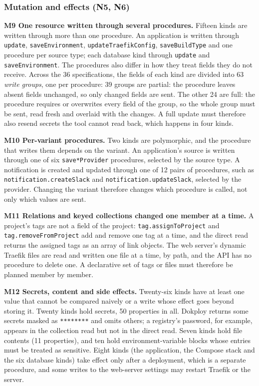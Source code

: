 \subsubsection*{Mutation and effects (N5, N6)}

\textbf{M9 One resource written through several procedures.} Fifteen kinds are written through more than one
procedure. An application is written through \texttt{update}, \texttt{saveEnvironment}, \texttt{updateTraefikConfig},
\texttt{saveBuildType} and one procedure per source type; each database kind through \texttt{update} and
\texttt{saveEnvironment}. The procedures also differ in how they treat fields they do not receive. Across
the 36 specifications, the fields of each kind are divided into 63 \emph{write groups}, one per procedure:
39 groups are partial: the procedure leaves absent fields unchanged, so only changed fields are sent.
The other 24 are full: the procedure requires or overwrites every field of the group, so the whole
group must be sent, read fresh and overlaid with the changes. A full update must therefore also resend
secrets the tool cannot read back, which happens in four kinds.

\textbf{M10 Per-variant procedures.} Two kinds are polymorphic, and the procedure that writes them depends
on the variant. An application's source is written through one of six \texttt{save*Provider} procedures,
selected by the source type. A notification is created and updated through one of 12 pairs of
procedures, such as \texttt{notification.createSlack} and \texttt{notification.updateSlack}, selected by the
provider. Changing the variant therefore changes which procedure is called, not only which values are
sent.

\textbf{M11 Relations and keyed collections changed one member at a time.} A project's tags are not a field
of the project: \texttt{tag.assignToProject} and \texttt{tag.removeFromProject} add and remove one tag at a time, and
the direct read returns the assigned tags as an array of link objects. The web server's dynamic
Traefik files are read and written one file at a time, by path, and the API has no procedure to delete
one. A declarative set of tags or files must therefore be planned member by member.

\textbf{M12 Secrets, content and side effects.} Twenty-six kinds have at least one value that cannot be
compared naively or a write whose effect goes beyond storing it. Twenty kinds hold secrets, 50
properties in all. Dokploy returns some secrets masked as \texttt{********} and omits others; a registry's
password, for example, appears in the collection read but not in the direct read. Seven kinds hold file contents (11 properties), and ten hold environment-variable blocks whose
entries must be treated as sensitive. Eight kinds (the application, the Compose stack and the six
database kinds) take effect only after a deployment, which is a separate procedure, and some writes
to the web-server settings may restart Traefik or the server.

